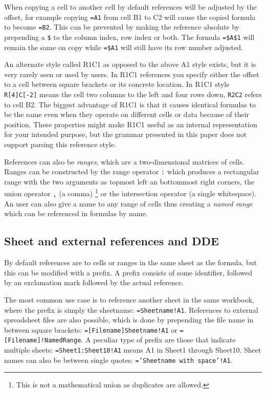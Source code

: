 \documentclass[conference]{IEEEtran}
\begin{document}
When copying a cell to another cell by default references will be adjusted by the offset, for example copying \texttt{=A1} from cell B1 to C2 will cause the copied formula to become \texttt{=B2}.
This can be prevented by making the reference absolute by prepending a \texttt{\$} to the column index, row index or both.
The formula \texttt{=\$A\$1} will remain the same on copy while \texttt{=\$A1} will still have its row number adjusted.

An alternate style called R1C1 as opposed to the above A1 style exists, but it is very rarely seen or used by users.
In R1C1 references you specify either the offset to a cell between square brackets or its concrete location.
In R1C1 style \texttt{R[4]C[-2]} means the cell two columns to the left and four rows down, \texttt{R2C2} refers to cell B2.
The biggest advantage of R1C1 is that it causes identical formulas to be the same even when they operate on different cells or data because of their position.
These properties might make R1C1 useful as an internal representation for your intended purpose, but the grammar presented in this paper does not support parsing this reference style.

References can also be \emph{ranges}, which are a two-dimensional matrices of cells.
Ranges can be constructed by the range operator \texttt{:} which produces a rectangular range with the two arguments as topmost left an bottommost right corners, the union operator \texttt{,} (a comma) \footnote{This is not a mathematical union as duplicates are allowed.} or the intersection operator \texttt{} (a single whitespace). 
An user can also give a name to any range of cells thus creating a \emph{named range} which can be referenced in formulas by name.

\subsection{Sheet and external references and DDE}

By default references are to cells or ranges in the same sheet as the formula, but this can be modified with a prefix. A prefix consists of some identifier, followed by an exclamation mark followed by the actual reference.

The most common use case is to reference another sheet in the same workbook, where the prefix is simply the sheetname: \texttt{=Sheetname!A1}. References to external spreadsheet files are also possible, which is done by prepending the file name in between square brackets: \texttt{=[Filename]Sheetname!A1} or \texttt{=[Filename]!NamedRange}.
A peculiar type of prefix are those that indicate multiple sheets: \texttt{=Sheet1:Sheet10!A1} means A1 in Sheet1 through Sheet10.
Sheet names can also be between single quotes: \texttt{='Sheetname with space'!A1}. 
\end{document}

